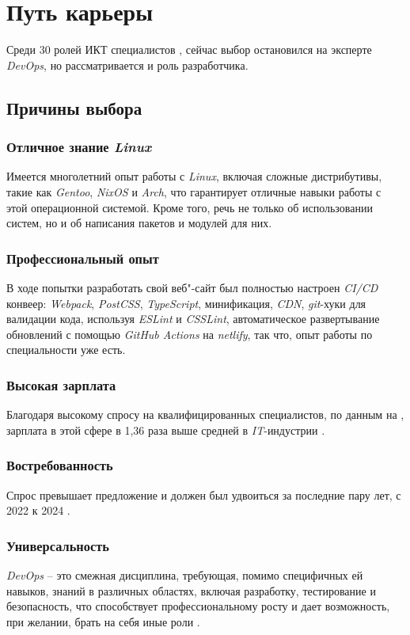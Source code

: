 \documentclass[variant=practice]{bsuir}
\begin{document}
\chapter{Путь карьеры}

Среди 30 ролей ИКТ специалистов \cite{majors}, сейчас выбор остановился на
эксперте \textit{DevOps}, но рассматривается и роль разработчика.

\section{Причины выбора}

\subsection{Отличное знание \textit{Linux}} Имеется многолетний опыт работы с
\textit{Linux}, включая сложные дистрибутивы, такие как \textit{Gentoo},
\textit{NixOS} и \textit{Arch}, что гарантирует отличные навыки работы с этой
операционной системой. Кроме того, речь не только об использовании систем, но и
об написания пакетов и модулей для них.

\subsection{Профессиональный опыт} В ходе попытки разработать свой веб"-сайт был
полностью настроен \textit{CI/CD} конвеер: \textit{Webpack}, \textit{PostCSS},
\textit{TypeScript}, минификация, \textit{CDN}, \textit{git}-хуки для валидации
кода, используя \textit{ESLint} и \textit{CSSLint}, автоматическое
развертывание обновлений с помощью \textit{GitHub Actions} на \textit{netlify},
так что, опыт работы по специальности уже есть.

\subsection{Высокая зарплата} Благодаря высокому спросу на квалифицированных
специалистов, по данным на  \cite{devops-habr}, зарплата
в этой сфере в 1,36 раза выше средней в \textit{IT}-индустрии \cite{devops-mts}.

\subsection{Востребованность} Спрос превышает предложение и должен был удвоиться
за последние пару лет, с 2022 к 2024 \cite{devops-mts}.

\subsection{Универсальность} \textit{DevOps} -- это смежная дисциплина,
требующая, помимо специфичных ей навыков, знаний в различных областях, включая
разработку, тестирование и безопасность, что способствует профессиональному
росту и дает возможность, при желании, брать на себя иные роли
\cite{devops-mts}.
\end{document}
